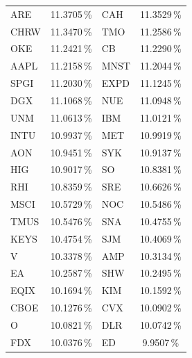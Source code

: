\begin{longtable}{l c | l c}
    ARE    & 11.3705\,\%            & CAH    & 11.3529\,\%                                   \\
    CHRW   & 11.3470\,\%            & TMO    & 11.2586\,\%                                   \\
    OKE    & 11.2421\,\%            & CB     & 11.2290\,\%                                   \\
    AAPL   & 11.2158\,\%            & MNST   & 11.2044\,\%                                   \\
    SPGI   & 11.2030\,\%            & EXPD   & 11.1245\,\%                                   \\
    DGX    & 11.1068\,\%            & NUE    & 11.0948\,\%                                   \\
    UNM    & 11.0613\,\%            & IBM    & 11.0121\,\%                                   \\
    INTU   & 10.9937\,\%            & MET    & 10.9919\,\%                                   \\
    AON    & 10.9451\,\%            & SYK    & 10.9137\,\%                                   \\
    HIG    & 10.9017\,\%            & SO     & 10.8381\,\%                                   \\
    RHI    & 10.8359\,\%            & SRE    & 10.6626\,\%                                   \\
    MSCI   & 10.5729\,\%            & NOC    & 10.5486\,\%                                   \\
    TMUS   & 10.5476\,\%            & SNA    & 10.4755\,\%                                   \\
    KEYS   & 10.4754\,\%            & SJM    & 10.4069\,\%                                   \\
    V      & 10.3378\,\%            & AMP    & 10.3134\,\%                                   \\
    EA     & 10.2587\,\%            & SHW    & 10.2495\,\%                                   \\
    EQIX   & 10.1694\,\%            & KIM    & 10.1592\,\%                                   \\
    CBOE   & 10.1276\,\%            & CVX    & 10.0902\,\%                                   \\
    O      & 10.0821\,\%            & DLR    & 10.0742\,\%                                   \\
    FDX    & 10.0376\,\%            & ED     & 9.9507\,\%                                    \\

\end{longtable}
